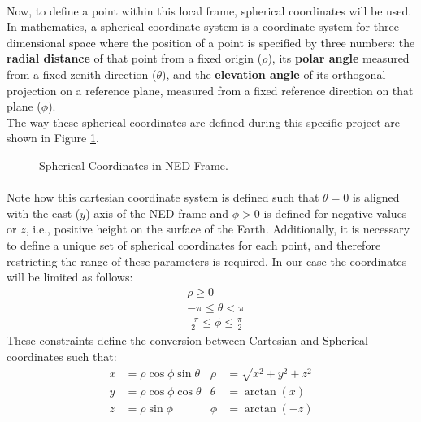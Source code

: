 \paragraph{} Now, to define a point within this local frame, spherical coordinates will be used. In mathematics, a spherical coordinate system is a coordinate system for three-dimensional space where the position of a point is specified by three numbers: the \textbf{radial distance} of that point from a fixed origin ($\rho$), its \textbf{polar angle} measured from a fixed zenith direction ($\theta$), and the \textbf{elevation angle} of its orthogonal projection on a reference plane, measured from a fixed reference direction on that plane ($\phi$).\\
The way these spherical coordinates are defined during this specific project are shown in Figure \ref{fig:Spherical1}.
\begin{figure}[H]
   \centering
     
    \caption{Spherical Coordinates in NED Frame.}
    \label{fig:Spherical1}
\end{figure}

\paragraph{} Note how this cartesian coordinate system is defined such that $\theta = 0$ is aligned with the east ($y$) axis of the NED frame and  $\phi > 0$ is defined for negative values or $z$, i.e., positive height on the surface of the Earth.
Additionally, it is necessary to define a unique set of spherical coordinates for each point, and therefore restricting the range of these parameters is required. In our case the coordinates will be limited as follows:
\begin{align*}
& \rho \geq 0 \\
& -\pi \leq \theta < \pi \\
& \frac{-\pi}{2} \leq \phi \leq \frac{\pi}{2}
\label{eq:los_distToHorizon}
\end{align*}
These constraints define the conversion between Cartesian and Spherical coordinates such that:
\begin{align*}
x &=  \rho\cos\phi\sin\theta  & \rho &= \sqrt{x^{2} + y^{2} + z^{2}} \\
y &= \rho\cos\phi\cos\theta   & \theta &= \arctan\left(x\right)\\
z &= \rho\sin\phi       & \phi &=  \arctan\left(-z\right)
\label{eq:los_distToHorizon}
\end{align*} 

